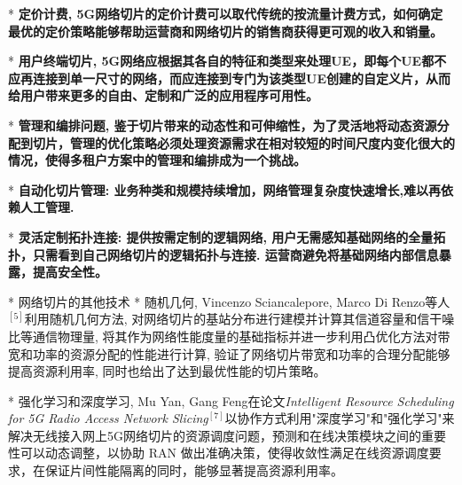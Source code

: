     * \bf{定价计费}, 5G网络切片的定价计费可以取代传统的按流量计费方式，如何确定最优的定价策略能够帮助运营商和网络切片的销售商获得更可观的收入和销量。

    * \bf{用户终端切片}, 5G网络应根据其各自的特征和类型来处理UE，即每个UE都不应再连接到单一尺寸的网络，而应连接到专门为该类型UE创建的自定义片，从而给用户带来更多的自由、定制和广泛的应用程序可用性。

    * \bf{管理和编排问题}, 鉴于切片带来的动态性和可伸缩性，为了灵活地将动态资源分配到切片，管理的优化策略必须处理资源需求在相对较短的时间尺度内变化很大的情况，使得多租户方案中的管理和编排成为一个挑战。

    * \bf{自动化切片管理}: 业务种类和规模持续增加，网络管理复杂度快速增长,难以再依赖人工管理.

    * \bf{灵活定制拓扑连接}: 提供按需定制的逻辑网络, 用户无需感知基础网络的全量拓扑，只需看到自己网络切片的逻辑拓扑与连接. 运营商避免将基础网络内部信息暴露，提高安全性。

    
* 网络切片的其他技术
    * 随机几何, Vincenzo Sciancalepore, Marco Di Renzo等人$^{[5]}$利用随机几何方法, 对网络切片的基站分布进行建模并计算其信道容量和信干噪比等通信物理量, 将其作为网络性能度量的基础指标并进一步利用凸优化方法对带宽和功率的资源分配的性能进行计算, 验证了网络切片带宽和功率的合理分配能够提高资源利用率, 同时也给出了达到最优性能的切片策略。
           
    * 强化学习和深度学习, Mu Yan, Gang Feng在论文\textit{Intelligent Resource Scheduling for 5G Radio Access Network Slicing}$^{[7]}$以协作方式利用"深度学习"和"强化学习"来解决无线接入网上5G网络切片的资源调度问题，预测和在线决策模块之间的重要性可以动态调整，以协助 RAN 做出准确决策，使得收敛性满足在线资源调度要求，在保证片间性能隔离的同时，能够显著提高资源利用率。

      
    
